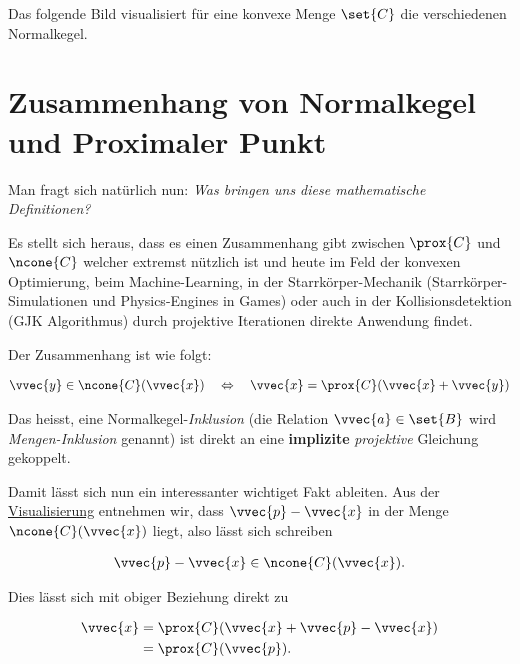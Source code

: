 \documentclass[
  12pt,
  a4paper,
  twoside,
  titlepage,
  openright,
  numbers=noenddot,
  chapterprefix=true,
  headings=optiontohead,
  svgnames,
  dvipsnames]{scrreprt}
\begin{document}
Das folgende Bild visualisiert für eine konvexe Menge \(\set{C}\) die
verschiedenen Normalkegel.


\hypertarget{zusammenhang-von-normalkegel-und-proximaler-punkt}{%
\section{Zusammenhang von Normalkegel und Proximaler
Punkt}\label{zusammenhang-von-normalkegel-und-proximaler-punkt}}

Man fragt sich natürlich nun: \emph{Was bringen uns diese mathematische
Definitionen?}

Es stellt sich heraus, dass es einen Zusammenhang gibt zwischen
\(\prox{C}\) und \(\ncone{C}\) welcher extremst nützlich ist und heute
im Feld der konvexen Optimierung, beim Machine-Learning, in der
Starrkörper-Mechanik (Starrkörper-Simulationen und Physics-Engines in
Games) oder auch in der Kollisionsdetektion (GJK Algorithmus) durch
projektive Iterationen direkte Anwendung findet.

Der Zusammenhang ist wie folgt:

\[\begin{align}
\vvec{y} \in \ncone{C}(\vvec{x}) \quad \Leftrightarrow \quad \vvec{x} = \prox{C}(\vvec{x} + \vvec{y})
\label{eq-prox-to-ncone}
\end{align}\]

Das heisst, eine Normalkegel-\emph{Inklusion} (die Relation
\(\vvec{a} \in \set{B}\) wird \emph{Mengen-Inklusion} genannt) ist
direkt an eine \textbf{implizite} \emph{projektive} Gleichung gekoppelt.

Damit lässt sich nun ein interessanter wichtiget Fakt ableiten. Aus der
\protect\hyperlink{nomal-cone-vis}{Visualisierung} entnehmen wir, dass
\(\vvec{p}-\vvec{x}\) in der Menge \(\ncone{C}(\vvec{x})\) liegt, also
lässt sich schreiben

\[\begin{align}
\vvec{p}-\vvec{x} \in \ncone{C}(\vvec{x}).
\end{align}\]

Dies lässt sich mit obiger Beziehung direkt zu

\[\begin{align}
\vvec{x} &= \prox{C}(\vvec{x} + \vvec{p} - \vvec{x}) \\
&= \prox{C}(\vvec{p}).
\end{align}\]
\end{document}

